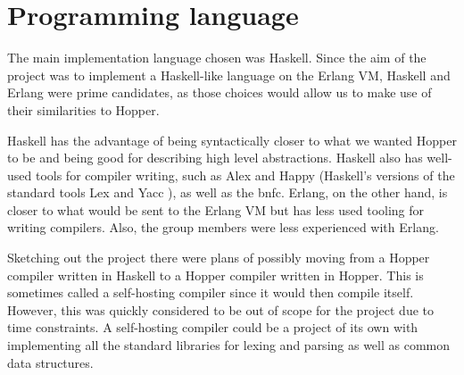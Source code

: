\section{Programming language}

The main implementation language chosen was Haskell. Since the aim of the project was to implement a Haskell-like language on the Erlang VM, Haskell and Erlang were prime candidates, as those choices would allow us to make use of their similarities to Hopper.

Haskell has the advantage of being syntactically closer to what we wanted Hopper to be and being good for describing high level abstractions. Haskell also has well-used tools for compiler writing, such as Alex \cite{alex} and Happy \cite{happy} (Haskell's versions of the standard tools Lex \cite{lex} and Yacc \cite{yacc}), as well as the \gls{bnfc}. Erlang, on the other hand, is closer to what would be sent to the Erlang VM but has less used tooling for writing compilers. Also, the group members were less experienced with Erlang.

Sketching out the project there were plans of possibly moving from a Hopper compiler written in Haskell to a Hopper compiler written in Hopper. This is sometimes called a self-hosting compiler since it would then compile itself. However, this was quickly considered to be out of scope for the project due to time constraints. A self-hosting compiler could be a project of its own with implementing all the standard libraries for lexing and parsing as well as common data structures. 

